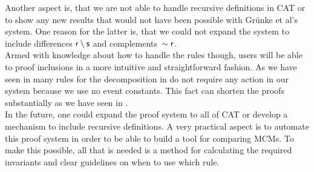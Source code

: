 \documentclass[a4paper,twoside,12pt, english]{article}
\begin{document}
Another aspect is, that we are not able to handle recursive definitions in CAT or to show any new results that would not have been possible with Grünke et al's system. One reason for the latter is, that we could not expand the system to include differences $\textsf{\upshape r} \setminus \textsf{\upshape s}$ and complements~$\sim \textsf{\upshape r}$. \\
Armed with knowledge about how to handle the rules though, users will be able to proof inclusions in a more intuitive and straightforward fashion.
As we have seen in  many rules for the decomposition in \cite{Gru+26} do not require any action in our system because we use no event constants. This fact can shorten the proofs substantially as we have seen in . \\

In the future, one could expand the proof system to all of CAT or develop a mechanism to include recursive definitions. A very practical aspect is to automate this proof system in order to be able to build a tool for comparing MCMs. To make this possible, all that is needed is a method for calculating the required invariants and clear guidelines on when to use which rule. 




\pagebreak
{}
\renewcommand{\bibfont}{\small}
\printbibliography
\pagebreak
\end{document}
